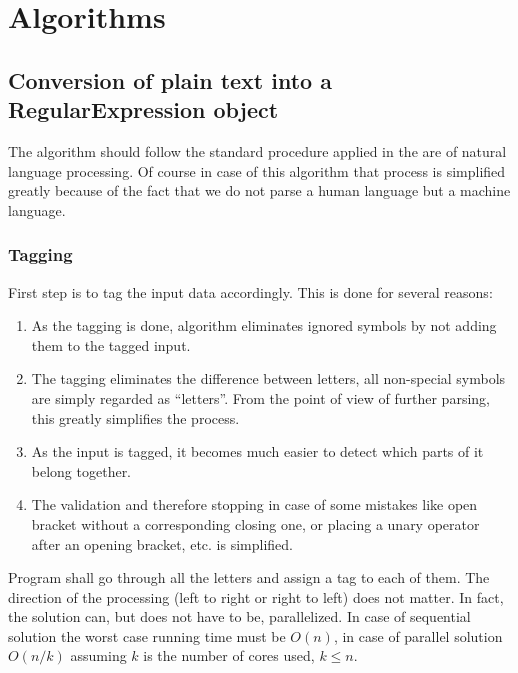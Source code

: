 \documentclass{article}
\begin{document}
\newpage

\section{Algorithms}

\subsection{Conversion of plain text into a RegularExpression object}
The algorithm should follow the standard procedure applied in the are of natural language
processing. Of course in case of this algorithm that process is simplified greatly because of the
fact that we do not parse a human language but a machine language.

\subsubsection{Tagging}
First step is to tag the input data accordingly. This is done for several reasons:

\begin{enumerate}

  \item As the tagging is done, algorithm eliminates ignored symbols by not adding them to the
  tagged input.

  \item The tagging eliminates the difference between letters, all non-special symbols are simply
  regarded as ``letters''. From the point of view of further parsing, this greatly simplifies the
  process.

  \item As the input is tagged, it becomes much easier to detect which parts of it belong together.

  \item The validation and therefore stopping in case of some mistakes like open bracket without a
  corresponding closing one, or placing a unary operator after an opening bracket, etc. is simplified.

\end{enumerate}

Program shall go through all the letters and assign a tag to each of them. The direction of the
processing (left to right or right to left) does not matter. In fact, the solution can, but does not
have to be, parallelized. In case of sequential solution the worst case running time must be $O(n)$,
in case of parallel solution $O(n/k)$ assuming $k$ is the number of cores used, $k \leq n$.
\end{document}
